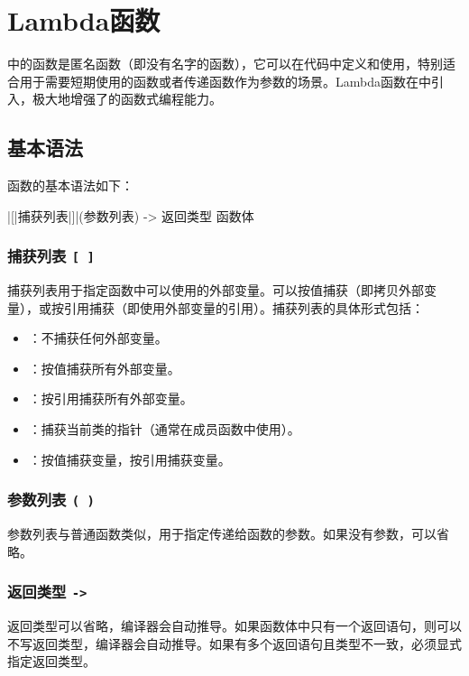 \chapter{Lambda函数}

中的函数是匿名函数（即没有名字的函数），它可以在代码中定义和使用，特别适合用于需要短期使用的函数或者传递函数作为参数的场景。Lambda函数在中引入，极大地增强了的函数式编程能力。

\section{基本语法}
函数的基本语法如下：
\begin{cpplst}
|[|捕获列表|]|(参数列表) -> 返回类型 {
    函数体
}
\end{cpplst}

\subsection{捕获列表 \texttt{[ ]}}
捕获列表用于指定函数中可以使用的外部变量。可以按值捕获（即拷贝外部变量），或按引用捕获（即使用外部变量的引用）。捕获列表的具体形式包括：
\begin{itemize}
	\item \cppinline{[ ]}：不捕获任何外部变量。
	\item \cppinline{[=]}：按值捕获所有外部变量。
	\item \cppinline{[&]}：按引用捕获所有外部变量。
	\item \cppinline{[this]}：捕获当前类的指针（通常在成员函数中使用）。
	\item \cppinline{[x, &y]}：按值捕获变量，按引用捕获变量。
\end{itemize}

\subsection{参数列表 \texttt{( )}}
参数列表与普通函数类似，用于指定传递给函数的参数。如果没有参数，可以省略。

\subsection{返回类型 \texttt{->}}
返回类型可以省略，编译器会自动推导。如果函数体中只有一个返回语句，则可以不写返回类型，编译器会自动推导。如果有多个返回语句且类型不一致，必须显式指定返回类型。

